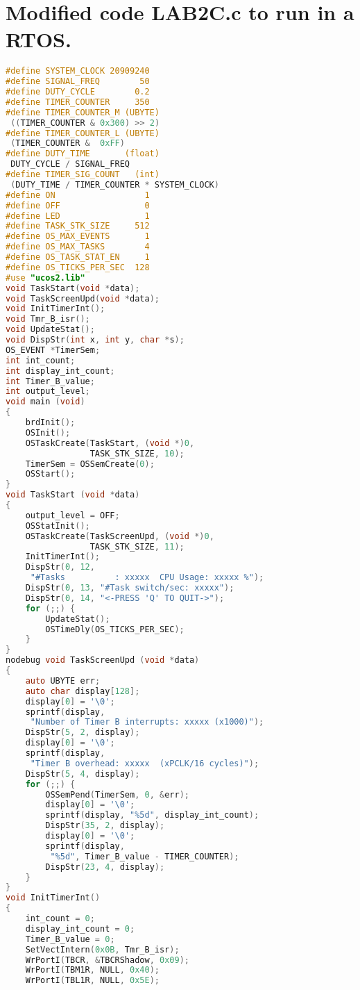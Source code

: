 \section{Modified code LAB2C.c to run in a RTOS.}
\begin{lstlisting}[language=C]
#define SYSTEM_CLOCK 20909240
#define SIGNAL_FREQ        50
#define DUTY_CYCLE        0.2
#define TIMER_COUNTER     350
#define TIMER_COUNTER_M (UBYTE)
 ((TIMER_COUNTER & 0x300) >> 2)
#define TIMER_COUNTER_L (UBYTE)
 (TIMER_COUNTER &  0xFF)
#define DUTY_TIME       (float)
 DUTY_CYCLE / SIGNAL_FREQ
#define TIMER_SIG_COUNT   (int)
 (DUTY_TIME / TIMER_COUNTER * SYSTEM_CLOCK)
#define ON                  1
#define OFF                 0
#define LED                 1
#define TASK_STK_SIZE     512
#define OS_MAX_EVENTS       1
#define OS_MAX_TASKS        4
#define OS_TASK_STAT_EN     1
#define OS_TICKS_PER_SEC  128
#use "ucos2.lib"
void TaskStart(void *data);
void TaskScreenUpd(void *data);
void InitTimerInt();
void Tmr_B_isr();
void UpdateStat();
void DispStr(int x, int y, char *s);
OS_EVENT *TimerSem;
int int_count;
int display_int_count;
int Timer_B_value;
int output_level;
void main (void)
{
    brdInit();
    OSInit();
    OSTaskCreate(TaskStart, (void *)0,
                 TASK_STK_SIZE, 10);
    TimerSem = OSSemCreate(0);
    OSStart();
}
void TaskStart (void *data)
{
    output_level = OFF;
    OSStatInit();
    OSTaskCreate(TaskScreenUpd, (void *)0,
                 TASK_STK_SIZE, 11);
    InitTimerInt();
    DispStr(0, 12,
     "#Tasks          : xxxxx  CPU Usage: xxxxx %");
    DispStr(0, 13, "#Task switch/sec: xxxxx");
    DispStr(0, 14, "<-PRESS 'Q' TO QUIT->");
    for (;;) {
        UpdateStat();
        OSTimeDly(OS_TICKS_PER_SEC);
    }
}
nodebug void TaskScreenUpd (void *data)
{
    auto UBYTE err;
    auto char display[128];
    display[0] = '\0';
    sprintf(display,
     "Number of Timer B interrupts: xxxxx (x1000)");
    DispStr(5, 2, display);
    display[0] = '\0';
    sprintf(display,
     "Timer B overhead: xxxxx  (xPCLK/16 cycles)");
    DispStr(5, 4, display);
    for (;;) {
        OSSemPend(TimerSem, 0, &err);
        display[0] = '\0';
        sprintf(display, "%5d", display_int_count);
        DispStr(35, 2, display);
        display[0] = '\0';
        sprintf(display,
         "%5d", Timer_B_value - TIMER_COUNTER);
        DispStr(23, 4, display);
    }
}
void InitTimerInt()
{
    int_count = 0;
    display_int_count = 0;
    Timer_B_value = 0;
    SetVectIntern(0x0B, Tmr_B_isr);
    WrPortI(TBCR, &TBCRShadow, 0x09);
    WrPortI(TBM1R, NULL, 0x40);
    WrPortI(TBL1R, NULL, 0x5E);

\end{lstlisting}
